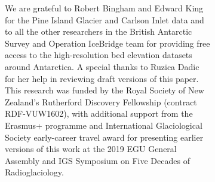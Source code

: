 \documentclass[tc, noline]{copernicus}
\begin{document}
\begin{figure}[t]
\begin{figure}[t]






\begin{acknowledgements}
  We are grateful to Robert Bingham and Edward King for the Pine Island Glacier and Carlson Inlet data and to all the other researchers in the
  British Antarctic Survey and Operation IceBridge team for providing free access to the high-resolution bed elevation datasets around Antarctica.
  A special thanks to Ruzica Dadic for her help in reviewing draft versions of this paper.
  This research was funded by the Royal Society of New Zealand's Rutherford Discovery Fellowship (contract RDF-VUW1602), with additional support from the Erasmus+ programme and International Glaciological Society early-career travel award for presenting earlier versions of this work at the 2019 EGU General Assembly and IGS Symposium on Five Decades of Radioglaciology.
\end{acknowledgements}













\end{figure}
\end{figure}
\end{document}

